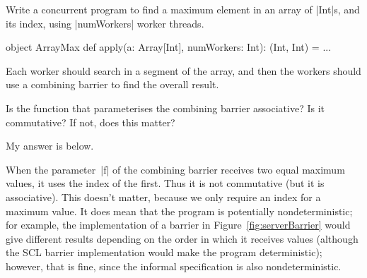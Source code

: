 \begin{questionS}
Write a concurrent program to find a maximum element in an array of |Int|s,
and its index, using |numWorkers| worker threads.  
%
\begin{scala}
object ArrayMax{
  def apply(a: Array[Int], numWorkers: Int): (Int, Int) = ... 
}
\end{scala}
%
Each worker should search in a segment of the array, and then the workers
should use a combining barrier to find the overall result.  

Is the function that parameterises the combining barrier associative?  Is it
commutative?  If not, does this matter?
\end{questionS}


\begin{answerS}
My answer is below.
%

When the parameter~|f| of the combining barrier receives two equal maximum
values, it uses the index of the first.  Thus it is not commutative (but it is
associative).  This doesn't matter, because we only require an index for a
maximum value.  It does mean that the program is potentially nondeterministic;
for example, the implementation of a barrier in Figure~\ref{fig:serverBarrier}
would give different results depending on the order in which it receives
values (although the SCL barrier implementation would make the program
deterministic); however, that is fine, since the informal specification is
also nondeterministic.


\end{answerS}
